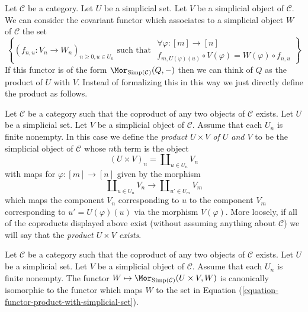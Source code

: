 \noindent
Let $\mathcal{C}$ be a category.
Let $U$ be a simplicial set.
Let $V$ be a simplicial object of $\mathcal{C}$.
We can consider the covariant functor which associates
to a simplicial object $W$ of $\mathcal{C}$
the set
\begin{equation}
\label{equation-functor-product-with-simplicial-set}
\left\{
(f_{n, u} : V_n \to W_n)_{n \geq 0, u \in U_n}
\text{ such that }
\begin{matrix}
\forall \varphi : [m] \to [n] \\
f_{m, U(\varphi)(u)} \circ V(\varphi) = W(\varphi) \circ f_{n, u}
\end{matrix}
\right\}
\end{equation}
If this functor is of the form
$\Mor_{\text{Simp}(\mathcal{C})}(Q, -)$
then we can think of $Q$ as the product of $U$ with $V$.
Instead of formalizing this in this way we just directly
define the product as follows.

\begin{definition}
\label{definition-product-with-simplicial-set}
Let $\mathcal{C}$ be a category such that the coproduct of
any two objects of $\mathcal{C}$ exists. Let
$U$ be a simplicial set. Let $V$ be a simplicial
object of $\mathcal{C}$. Assume that each $U_n$ is
finite nonempty. In this case we define
the {\it product $U \times V$ of $U$ and $V$}
to be the simplicial object of $\mathcal{C}$ whose
$n$th term is the object
$$
(U \times V)_n = \coprod\nolimits_{u\in U_n} V_n
$$
with maps for $\varphi : [m] \to [n]$ given by the
morphism
$$
\coprod\nolimits_{u\in U_n} V_n
\longrightarrow
\coprod\nolimits_{u'\in U_m} V_m
$$
which maps the component $V_n$ corresponding to $u$ to the
component $V_m$ corresponding to $u' = U(\varphi)(u)$
via the morphism $V(\varphi)$.
More loosely, if all of the coproducts displayed above
exist (without assuming anything about $\mathcal{C}$)
we will say that the {\it product $U \times V$ exists}.
\end{definition}

\begin{lemma}
\label{lemma-check-product-with-simplicial-set}
Let $\mathcal{C}$ be a category such that the coproduct of
any two objects of $\mathcal{C}$ exists. Let
$U$ be a simplicial set. Let $V$ be a simplicial
object of $\mathcal{C}$. Assume that each $U_n$ is
finite nonempty. The functor
$W \mapsto \Mor_{\text{Simp}(\mathcal{C})}(U \times V, W)$
is canonically isomorphic to the functor which
maps $W$ to the set in
Equation (\ref{equation-functor-product-with-simplicial-set}).
\end{lemma}

